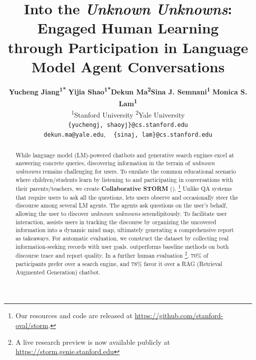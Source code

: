 \documentclass[11pt]{article}
\title{Into the \textit{Unknown Unknowns}: Engaged Human Learning \\
through Participation in Language Model Agent Conversations}
\author{
 \textbf{Yucheng Jiang\textsuperscript{1*}}\quad
 \textbf{Yijia Shao\textsuperscript{1*}}\quad\textbf{Dekun Ma\textsuperscript{2}}\quad\textbf{Sina J. Semnani\textsuperscript{1}}\quad
 \textbf{Monica S. Lam\textsuperscript{1}}
\\
 \textsuperscript{1}Stanford University \quad
 \textsuperscript{2}Yale University\\
\texttt{\{yuchengj, shaoyj\}@cs.stanford.edu} \\ \texttt{dekun.ma@yale.edu}, ~
\texttt{\{sinaj, lam\}@cs.stanford.edu}\\
}
\begin{document}
\maketitle
\def\thefootnote{*}\def\thefootnote{\arabic{footnote}}
\begin{abstract}

While language model (LM)-powered chatbots and generative search engines excel at answering concrete queries, discovering information in the terrain of \textit{unknown unknowns} remains challenging for users. %
To emulate the common educational scenario where children/students learn by listening to and participating in conversations with their parents/teachers, we create \textbf{Collaborative STORM} (\textbf{\system}). \footnote{Our resources and code are released at \url{https://github.com/stanford-oval/storm}.}
Unlike QA systems that require users to ask all the questions, \system lets users observe and occasionally steer the discourse among several LM agents. The agents ask questions on the user's behalf, allowing the user to discover \textit{unknown unknowns} serendipitously. To facilitate user interaction, \system assists users in tracking the discourse by organizing the uncovered information into a dynamic mind map, ultimately generating a comprehensive report as takeaways. For automatic evaluation, we construct the \data dataset by collecting real information-seeking records with user goals. \system outperforms baseline methods on both discourse trace and report quality. In a further human evaluation \footnote{A live research preview is now available publicly at \url{https://storm.genie.stanford.edu}}, 70\% of participants prefer \system over a search engine, and 78\% favor it over a RAG (Retrieval Augmented Generation) chatbot.


\end{abstract}
\end{document}
